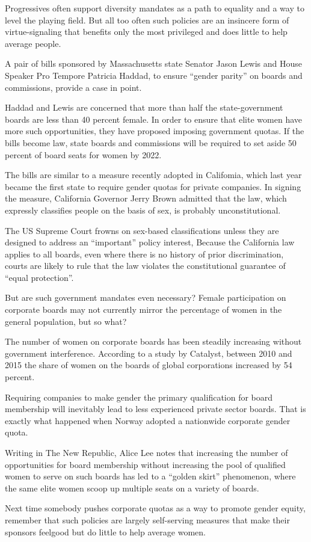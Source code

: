 Progressives often support diversity mandates as a path to equality and a way to level the playing field. But all too often such policies are an insincere form of virtue-signaling that benefits only the most privileged and does little to help average people.


A pair of bills sponsored by Massachusetts state Senator Jason Lewis and House Speaker Pro Tempore Patricia Haddad, to ensure ``gender parity'' on boards and commissions, provide a case in point.


Haddad and Lewis are concerned that more than half the state-government    boards are less than 40 percent female. In order to ensure that elite women have more  such opportunities, they have proposed imposing government quotas. If the bills   become law, state boards and commissions will be required to set aside 50 percent of board seats for women by 2022.


The bills are similar to a measure recently adopted in Califomia, which last year became the first state to require gender quotas for private companies. In signing the measure, California Governor Jerry Brown admitted that the law, which expressly classifies people on the basis of sex, is probably unconstitutional.


The US Supreme Court frowns on sex-based classifications unless they are  designed to address an ``important'' policy interest, Because the California law applies   to all boards, even where there is no history of prior discrimination, courts are likely to rule that the law violates the constitutional guarantee of ``equal protection''.


But are such government mandates even necessary? Female participation on corporate boards may not currently mirror the percentage of women in the general population, but so what?


The number of women on corporate boards has been steadily increasing without government interference. According to a study by Catalyst, between 2010 and 2015  the share of women on the boards of global corporations increased by 54 percent.


Requiring companies to make gender the primary qualification for board membership will inevitably lead to less experienced private sector boards. That is exactly what happened when Norway adopted a nationwide corporate gender quota.


Writing in The New Republic, Alice Lee notes that increasing the number of opportunities for board membership without increasing the pool of qualified women to serve on such boards has led to a ``golden skirt'' phenomenon, where the same elite women scoop up multiple seats on a variety of boards.


Next time somebody pushes corporate quotas as a way to promote gender equity, remember that such policies are largely self-serving measures that make their sponsors feelgood but do little to help average women.